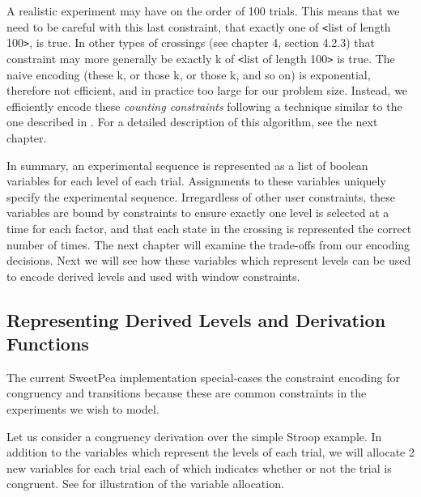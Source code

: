 A realistic experiment may have on the order of 100 trials. This means that we need to be careful with this last constraint, that exactly one of \texttt{<}list of length 100\texttt{>}, is true. In other types of crossings (see chapter 4, section 4.2.3) that constraint may more generally be exactly k of \texttt{<}list of length 100\texttt{>} is true. The naive encoding (these k, or those k, or those k, and so on) is exponential, therefore not efficient, and in practice too large for our problem size. Instead, we efficiently encode these \emph{counting constraints} following a technique similar to the one described in \cite{sinz2005towards}. For a detailed description of this algorithm, see the next chapter.

In summary, an experimental sequence is represented as a list of boolean variables for each level of each trial. Assignments to these variables uniquely specify the experimental sequence. Irregardless of other user constraints, these variables are bound by constraints to ensure exactly one level is selected at a time for each factor, and that each state in the crossing is represented the correct number of times. The next chapter will examine the trade-offs from our encoding decisions. Next we will see how these variables which represent levels can be used to encode derived levels and used with window constraints.

\subsection{Representing Derived Levels and Derivation Functions}

The current SweetPea implementation special-cases the constraint encoding for congruency and transitions because these are common constraints in the experiments we wish to model.

Let us consider a congruency derivation over the simple Stroop example. In addition to the variables which represent the levels of each trial, we will allocate 2 new variables for each trial each of which indicates whether or not the trial is congruent. See  for illustration of the variable allocation.






